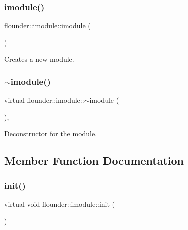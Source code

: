 \subsubsection{\texorpdfstring{imodule()}{imodule()}}
{\footnotesize\ttfamily flounder\+::imodule\+::imodule (\begin{DoxyParamCaption}{ }\end{DoxyParamCaption})\hspace{0.3cm}{\ttfamily [inline]}}



Creates a new module. 

\mbox{\label{classflounder_1_1imodule_a519b8530d27d6c21d591e12e776ef834}} 
\subsubsection{\texorpdfstring{$\sim$imodule()}{~imodule()}}
{\footnotesize\ttfamily virtual flounder\+::imodule\+::$\sim$imodule (\begin{DoxyParamCaption}{ }\end{DoxyParamCaption})\hspace{0.3cm}{\ttfamily [inline]}, {\ttfamily [virtual]}}



Deconstructor for the module. 



\subsection{Member Function Documentation}
\mbox{\label{classflounder_1_1imodule_a1725ef346952884d0741de61aba1e0c7}} 
\subsubsection{\texorpdfstring{init()}{init()}}
{\footnotesize\ttfamily virtual void flounder\+::imodule\+::init (\begin{DoxyParamCaption}{ }\end{DoxyParamCaption})\hspace{0.3cm}{\ttfamily [pure virtual]}}



